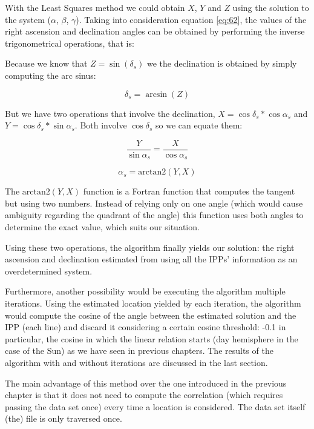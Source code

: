 With the Least Squares method we could obtain $X$, $Y$ and $Z$ using the solution to the system ($\alpha$, $\beta$, $\gamma$). Taking into consideration equation \ref{eq:62}, the values of the right ascension and declination angles can be obtained by performing the inverse trigonometrical operations, that is:

Because we know that $Z=\sin(\delta_{s})$ we the declination is obtained by simply computing the arc sinus:

\begin{equation} \label{eq:inverseTrigoTriennal}
\delta_{s} = \arcsin(Z)
\end{equation}

But we have two operations that involve the declination, $X=\cos\delta_{s} * \cos\alpha_{s}$ and $Y=\cos\delta_{s} * \sin\alpha_{s}$. Both involve $\cos\delta_{s}$ so we can equate them:

\begin{equation} \label{eq:rmCos}
\frac{Y}{\sin\alpha_{s}} = \frac{X}{\cos\alpha_{s}}
\end{equation}


\begin{equation} \label{eq:inverseTrigoAtan}
\alpha_{s} = \text{arctan2}(Y,X)
\end{equation}

The $\text{arctan2}(Y,X)$ function is a Fortran function that computes the tangent but using two numbers. Instead of relying only on one angle (which would cause ambiguity regarding the quadrant of the angle) this function uses both angles to determine the exact value, which suits our situation.

Using these two operations, the algorithm finally yields our solution: the right ascension and declination estimated from using all the IPPs' information as an overdetermined system.

Furthermore, another possibility would be executing the algorithm multiple iterations. Using the estimated location yielded by each iteration, the algorithm would compute the cosine of the angle between the estimated solution and the IPP (each line) and discard it considering a certain cosine threshold: -0.1 in particular, the cosine in which the linear relation starts (day hemisphere in the case of the Sun) as we have seen in previous chapters. The results of the algorithm with and without iterations are discussed in the last section.

The main advantage of this method over the one introduced in the previous chapter is that it does not need to compute the correlation (which requires passing the data set once) every time a location is considered. The data set itself (the) file is only traversed once.

